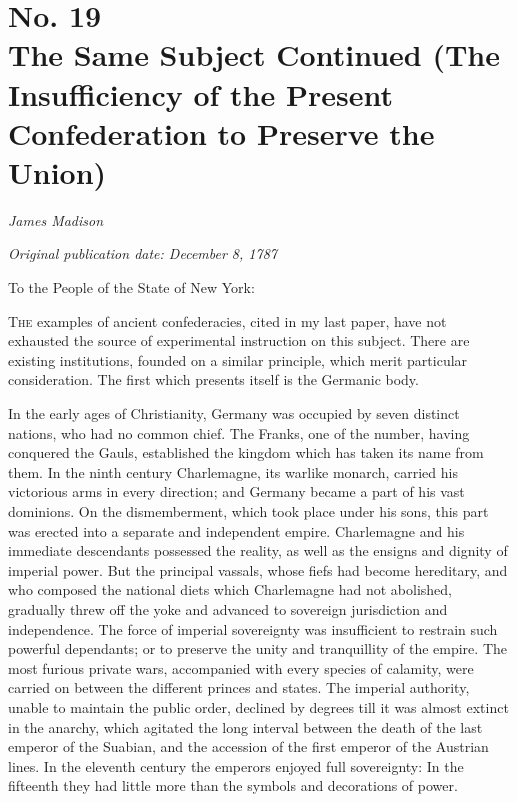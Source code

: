 \chapter[No. 19: The Same Subject Continued (The Insufficiency of the Present Confederation to Preserve the Union)]{No. 19\\ {\small The Same Subject Continued (The Insufficiency of the Present Confederation to Preserve the Union)}}

\textit{James Madison}

\textit{Original publication date: December 8, 1787}
\vspace{1cm}

To the People of the State of New York:
\vspace{.4cm}

\textsc{The} examples of ancient confederacies, cited in my last paper, have not exhausted the source of experimental instruction on this subject. 
There are existing institutions, founded on a similar principle, which merit particular consideration. 
The first which presents itself is the Germanic body.

In the early ages of Christianity, Germany was occupied by seven distinct nations, who had no common chief. 
The Franks, one of the number, having conquered the Gauls, established the kingdom which has taken its name from them. 
In the ninth century Charlemagne, its warlike monarch, carried his victorious arms in every direction; and Germany became a part of his vast dominions. 
On the dismemberment, which took place under his sons, this part was erected into a separate and independent empire. 
Charlemagne and his immediate descendants possessed the reality, as well as the ensigns and dignity of imperial power. 
But the principal vassals, whose fiefs had become hereditary, and who composed the national diets which Charlemagne had not abolished, gradually threw off the yoke and advanced to sovereign jurisdiction and independence. 
The force of imperial sovereignty was insufficient to restrain such powerful dependants; or to preserve the unity and tranquillity of the empire. 
The most furious private wars, accompanied with every species of calamity, were carried on between the different princes and states. 
The imperial authority, unable to maintain the public order, declined by degrees till it was almost extinct in the anarchy, which agitated the long interval between the death of the last emperor of the Suabian, and the accession of the first emperor of the Austrian lines. 
In the eleventh century the emperors enjoyed full sovereignty: In the fifteenth they had little more than the symbols and decorations of power.

